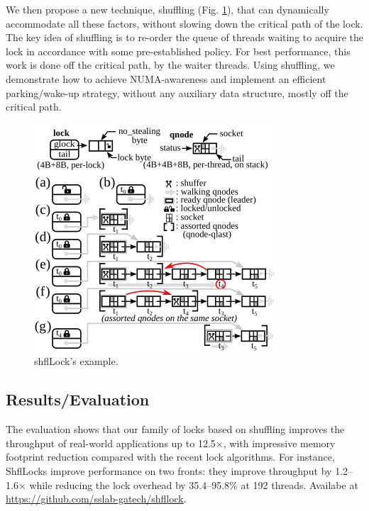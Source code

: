 We then propose a new technique, shuffling (Fig. \ref{fig:shfllock}), that can dynamically accommodate all these factors, without slowing down the critical path of the lock. The key idea of shuffling is to re-order the queue of threads waiting to acquire the lock in accordance with some pre-established policy. For best performance, this work is done off the critical path, by the waiter threads. Using shuffling, we demonstrate how to achieve NUMA-awareness and implement an efficient parking/wake-up strategy, without any auxiliary data structure, mostly off the critical path.  

\begin{figure}[h]
    \centering
    \includegraphics[width=\linewidth]{shfllock.png} %
    \caption{shflLock's example.}	
    \label{fig:shfllock}
\end{figure}
\subsection{Results/Evaluation}
The evaluation shows that our family of locks based on shuffling improves the throughput of real-world applications up to 12.5$\times$, with impressive memory footprint reduction compared with the recent lock algorithms. For instance,  ShflLocks improve performance on two fronts: they improve throughput by 1.2–1.6$\times$ while reducing the lock overhead by 35.4–95.8\% at 192 threads.  Availabe at \url{https://github.com/sslab-gatech/shfllock}.
